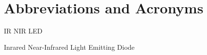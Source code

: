 \chapter{Abbreviations and Acronyms}\label{chapter:abbreviations}

\begin{multicols}{2}
\setlength{\parindent}{0pt}

	IR
	\hfill \break 
	NIR
	\hfill \break 
	LED

\columnbreak
 
	Inrared
 	\hfill \break
	Near-Infrared
	\hfill \break 
	Light Emitting Diode

\end{multicols}